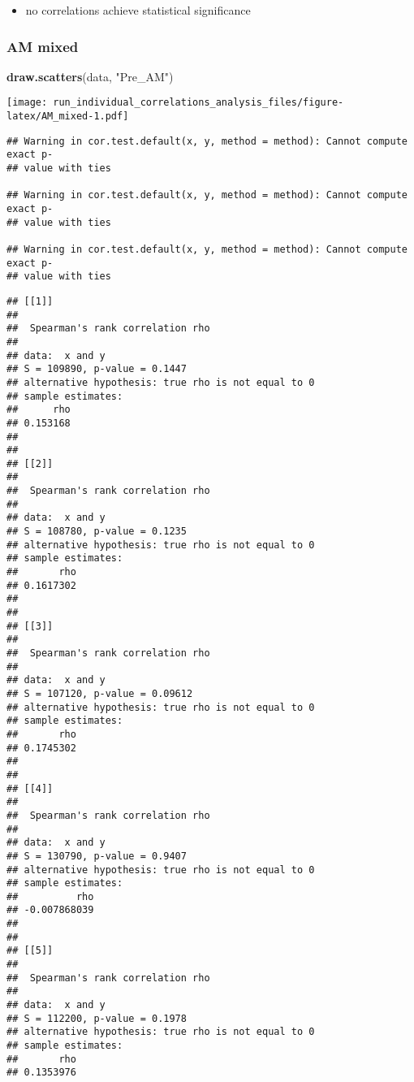\documentclass[]{article}
\newenvironment{Shaded}{\begin{snugshade}}{\end{snugshade}}
\newcommand{\KeywordTok}[1]{\textcolor[rgb]{0.13,0.29,0.53}{\textbf{#1}}}
\newcommand{\DataTypeTok}[1]{\textcolor[rgb]{0.13,0.29,0.53}{#1}}
\newcommand{\StringTok}[1]{\textcolor[rgb]{0.31,0.60,0.02}{#1}}
\newcommand{\OperatorTok}[1]{\textcolor[rgb]{0.81,0.36,0.00}{\textbf{#1}}}
\newcommand{\NormalTok}[1]{#1}
\providecommand{\tightlist}{%
  \setlength{\itemsep}{0pt}\setlength{\parskip}{0pt}}
\begin{document}
\begin{itemize}
\tightlist
\item
  no correlations achieve statistical significance
\end{itemize}

\subsubsection{AM mixed}\label{am-mixed}

\begin{Shaded}
\begin{Highlighting}[]
\KeywordTok{draw.scatters}\NormalTok{(data, }\StringTok{"Pre_AM"}\NormalTok{)}
\end{Highlighting}
\end{Shaded}

\texttt{[image: run\_individual\_correlations\_analysis\_files/figure-latex/AM\_mixed-1.pdf]}

\begin{Shaded}
\end{Shaded}

\begin{verbatim}
## Warning in cor.test.default(x, y, method = method): Cannot compute exact p-
## value with ties

## Warning in cor.test.default(x, y, method = method): Cannot compute exact p-
## value with ties

## Warning in cor.test.default(x, y, method = method): Cannot compute exact p-
## value with ties
\end{verbatim}

\begin{verbatim}
## [[1]]
## 
##  Spearman's rank correlation rho
## 
## data:  x and y
## S = 109890, p-value = 0.1447
## alternative hypothesis: true rho is not equal to 0
## sample estimates:
##      rho 
## 0.153168 
## 
## 
## [[2]]
## 
##  Spearman's rank correlation rho
## 
## data:  x and y
## S = 108780, p-value = 0.1235
## alternative hypothesis: true rho is not equal to 0
## sample estimates:
##       rho 
## 0.1617302 
## 
## 
## [[3]]
## 
##  Spearman's rank correlation rho
## 
## data:  x and y
## S = 107120, p-value = 0.09612
## alternative hypothesis: true rho is not equal to 0
## sample estimates:
##       rho 
## 0.1745302 
## 
## 
## [[4]]
## 
##  Spearman's rank correlation rho
## 
## data:  x and y
## S = 130790, p-value = 0.9407
## alternative hypothesis: true rho is not equal to 0
## sample estimates:
##          rho 
## -0.007868039 
## 
## 
## [[5]]
## 
##  Spearman's rank correlation rho
## 
## data:  x and y
## S = 112200, p-value = 0.1978
## alternative hypothesis: true rho is not equal to 0
## sample estimates:
##       rho 
## 0.1353976
\end{verbatim}
\end{document}
